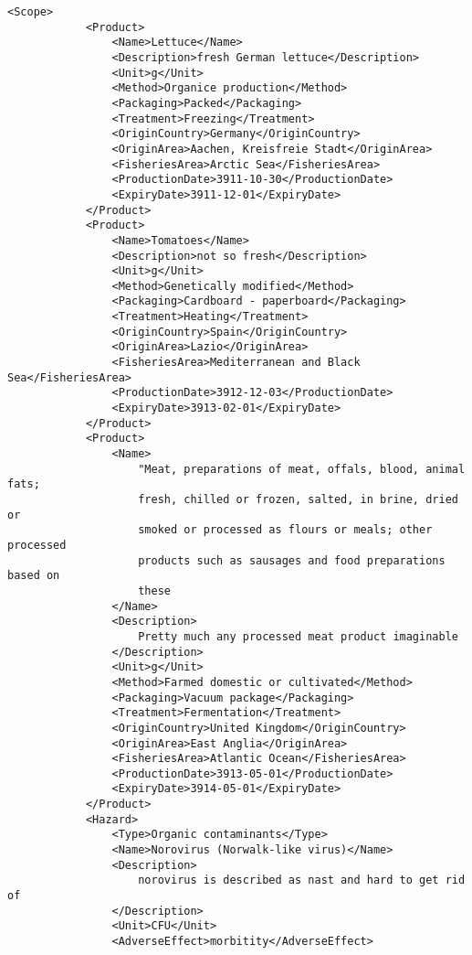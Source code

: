 \begin{lstlisting}[language=RAKIP, caption={Example of GenericModel}]
        <Scope>
            <Product>
                <Name>Lettuce</Name>
                <Description>fresh German lettuce</Description>
                <Unit>g</Unit>
                <Method>Organice production</Method>
                <Packaging>Packed</Packaging>
                <Treatment>Freezing</Treatment>
                <OriginCountry>Germany</OriginCountry>
                <OriginArea>Aachen, Kreisfreie Stadt</OriginArea>
                <FisheriesArea>Arctic Sea</FisheriesArea>
                <ProductionDate>3911-10-30</ProductionDate>
                <ExpiryDate>3911-12-01</ExpiryDate>
            </Product>
            <Product>
                <Name>Tomatoes</Name>
                <Description>not so fresh</Description>
                <Unit>g</Unit>
                <Method>Genetically modified</Method>
                <Packaging>Cardboard - paperboard</Packaging>
                <Treatment>Heating</Treatment>
                <OriginCountry>Spain</OriginCountry>
                <OriginArea>Lazio</OriginArea>
                <FisheriesArea>Mediterranean and Black Sea</FisheriesArea>
                <ProductionDate>3912-12-03</ProductionDate>
                <ExpiryDate>3913-02-01</ExpiryDate>
            </Product>
            <Product>
                <Name>
                    "Meat, preparations of meat, offals, blood, animal fats;
                    fresh, chilled or frozen, salted, in brine, dried or
                    smoked or processed as flours or meals; other processed
                    products such as sausages and food preparations based on
                    these
                </Name>
                <Description>
                    Pretty much any processed meat product imaginable
                </Description>
                <Unit>g</Unit>
                <Method>Farmed domestic or cultivated</Method>
                <Packaging>Vacuum package</Packaging>
                <Treatment>Fermentation</Treatment>
                <OriginCountry>United Kingdom</OriginCountry>
                <OriginArea>East Anglia</OriginArea>
                <FisheriesArea>Atlantic Ocean</FisheriesArea>
                <ProductionDate>3913-05-01</ProductionDate>
                <ExpiryDate>3914-05-01</ExpiryDate>
            </Product>
            <Hazard>
                <Type>Organic contaminants</Type>
                <Name>Norovirus (Norwalk-like virus)</Name>
                <Description>
                    norovirus is described as nast and hard to get rid of
                </Description>
                <Unit>CFU</Unit>
                <AdverseEffect>morbitity</AdverseEffect>

\end{lstlisting}
